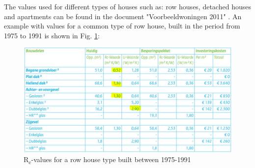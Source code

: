 The values used for different types of houses such as: row houses, detached houses and apartments can be found in the document "Voorbeeldwoningen 2011" \cite{VOORBEELD}. An example with values for a common type of row house, built in the period from 1975 to 1991 is shown in Fig. \ref{fig:rowhouse}:


\begin{figure}[H]
	\centering
	\includegraphics[width=0.8\columnwidth]{Pictures/row_house_1975-1991.JPG}
	\caption[Short title]{R\textsubscript{c}-values for a row house type built between 1975-1991 \cite{VOORBEELD}}
	\label{fig:rowhouse}
\end{figure} 

